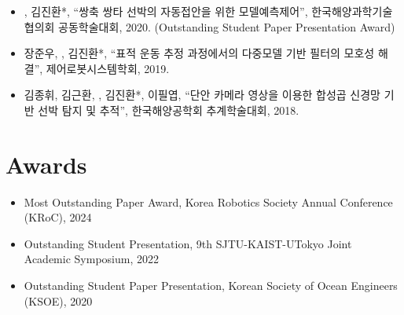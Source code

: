 \documentclass[10pt, letterpaper]{article}
\begin{document}
\begin{itemize}
        \item {}, 김진환*, “쌍축 쌍타 선박의 자동접안을 위한 모델예측제어”, 한국해양과학기술협의회 공동학술대회, 2020. (Outstanding Student Paper Presentation Award)
            
            \vspace{0.2 cm}
        
        \item 장준우, , 김진환*, “표적 운동 추정 과정에서의 다중모델 기반 필터의 모호성 해결”, 제어로봇시스템학회, 2019. 
            
            \vspace{0.2 cm}
        
        \item 김종휘, 김근환, , 김진환*, 이필엽, “단안 카메라 영상을 이용한 합성곱 신경망 기반 선박 탐지 및 추적”, 한국해양공학회 추계학술대회, 2018.
    \end{itemize}

    \section{Awards}
    \begin{itemize}
        \item  \textcolor{NavyBlue}{Most Outstanding Paper Award}, Korea Robotics Society Annual Conference (KRoC), 2024
            
        \vspace{0.2 cm}
        
        \item  \textcolor{NavyBlue}{Outstanding Student Presentation}, 9th SJTU-KAIST-UTokyo Joint Academic Symposium, 2022
            
        \vspace{0.2 cm}
        
        \item \textcolor{NavyBlue}{Outstanding Student Paper Presentation}, Korean Society of Ocean Engineers (KSOE), 2020
    \end{itemize}
\end{document}
